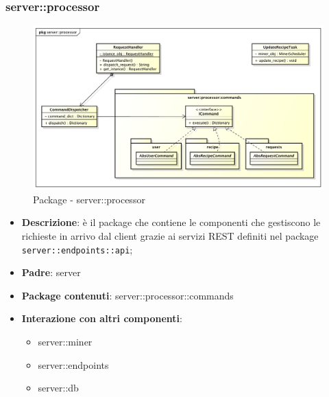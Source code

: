 


\subsubsection{server::processor} %
\label{ssub:bdsm_app_server_processor}
\begin{figure}[!htbp]
	\centering
	\centerline{\includegraphics[scale=0.4]{./images/server/processor.pdf}}
	\caption{Package - server::processor}
\end{figure}

\begin{itemize}
  \item \textbf{Descrizione}: è il package che contiene le componenti che gestiscono le richieste in arrivo dal client grazie ai servizi REST definiti nel package \texttt{server::endpoints::api};
  \item \textbf{Padre}: server
  \item \textbf{Package contenuti}: server::processor::commands
  \item \textbf{Interazione con altri componenti}:
    \begin{itemize}
      \item server::miner
      \item server::endpoints
      \item server::db
    \end{itemize}
\end{itemize}

